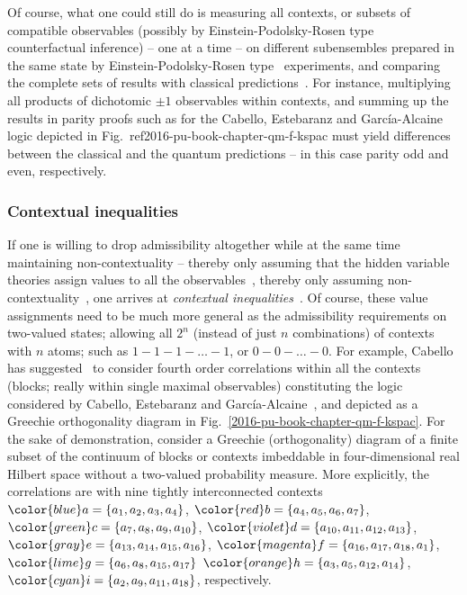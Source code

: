 Of course, what one could still do is measuring all contexts, or subsets of compatible observables
(possibly by Einstein-Podolsky-Rosen type~\cite{epr} counterfactual inference) -- one at a time --
 on different subensembles
prepared in the same state by Einstein-Podolsky-Rosen type~\cite{epr} experiments,
and comparing the complete sets of results
with classical predictions~\cite{ghz}.
For instance, multiplying all products  of dichotomic $\pm 1$ observables within contexts,
and summing up the results in
parity proofs such as for the Cabello, Estebaranz and Garc{\'{i}}a-Alcaine logic
depicted in Fig.~ref{2016-pu-book-chapter-qm-f-kspac}
must yield differences between the classical and the quantum predictions --
in this case parity odd and even, respectively.

\subsubsection*{Contextual inequalities}

If one is willing to drop admissibility altogether while at the same time maintaining non-contextuality -- thereby only assuming
that the hidden variable theories assign
values to all the observables~\cite[Sect.~4, p.~375]{Bengtsson-2012},
thereby  only assuming non-contextuality~\cite{cabello:210401},
one arrives at {\em contextual inequalities}~\cite{cabello-2013-ncyclea}.
Of course, these value assignments need to be much more general as the admissibility requirements on
two-valued states; allowing all $2^n$ (instead of just $n$ combinations) of contexts with $n$ atoms;
such as $1-1-1- \ldots -1$, or $0-0-\ldots -0$.
For example, Cabello has suggested~\cite{cabello:210401} to consider fourth order correlations within all the contexts
(blocks; really within single maximal observables)
constituting the logic considered by
Cabello, Estebaranz and Garc{\'{i}}a-Alcaine~\cite{cabello-96,cabello-99},
and depicted as a Greechie orthogonality diagram in Fig.~\ref{2016-pu-book-chapter-qm-f-kspac}.
For the sake of demonstration, consider a Greechie (orthogonality) diagram of a
finite subset of the continuum of blocks or contexts imbeddable in
four-dimensional real Hilbert space without a two-valued probability measure.
More explicitly, the correlations are with  nine tightly interconnected contexts
$\color{blue}a=\{a_1,a_2,a_3,a_4\}$,
$\color{red}b=\{a_4,a_5,a_6,a_7\}$,
$\color{green}c=\{a_7,a_8,a_9,a_{10}\}$,
$\color{violet}d=\{a_{10},a_{11},a_{12},a_{13}\}$,
$\color{gray}e=\{a_{13},a_{14},a_{15},a_{16}\}$,
$\color{magenta}f=\{a_{16},a_{17},a_{18},a_1\}$,
$\color{lime}g=\{a_6,a_8,a_{15},a_{17}\}$
$\color{orange}h=\{a_3,a_5,a_{12},a_{14}\}$,
$\color{cyan}i=\{a_2,a_9,a_{11},a_{18}\}$, respectively.

